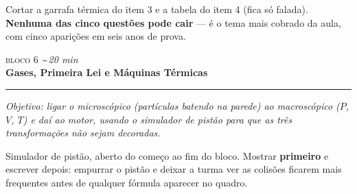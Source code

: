 \documentclass[11pt,a4paper]{article}
\newcommand{\bloco}[3]{%
  \needspace{7\baselineskip}
  \vspace{1.8em}
  {\scshape\color{vinho}bloco #1}\hfill
    {\small\itshape\color{grafite}\textasciitilde\,#3 min}\\[0.1em]
  {\Large\bfseries #2}\\[-0.55em]
  {\color{black!30}\rule{\linewidth}{0.5pt}}
  \par\nobreak\smallskip
}
\newcommand{\objetivo}[1]{{\itshape\color{grafite}Objetivo: #1}\par\smallskip}
\begin{document}
\begin{corte}
Cortar a garrafa t\'ermica do item 3 e a tabela do item 4 (fica s\'o falada).
\textbf{Nenhuma das cinco quest\~oes pode cair} --- \'e o tema mais cobrado
da aula, com cinco apari\c{c}\~oes em seis anos de prova.
\end{corte}

\bloco{6}{Gases, Primeira Lei e M\'aquinas T\'ermicas}{20}

\objetivo{ligar o microsc\'opico (part\'iculas batendo na parede) ao
macrosc\'opico ($P$, $V$, $T$) e da\'i ao motor, usando o simulador de
pist\~ao para que as tr\^es transforma\c{c}\~oes n\~ao sejam decoradas.}

\begin{projetor}
Simulador de pist\~ao, aberto do come\c{c}o ao fim do bloco. Mostrar
\textbf{primeiro} e escrever depois: empurrar o pist\~ao e deixar a turma
ver as colis\~oes ficarem mais frequentes antes de qualquer f\'ormula
aparecer no quadro.
\end{projetor}
\end{document}
